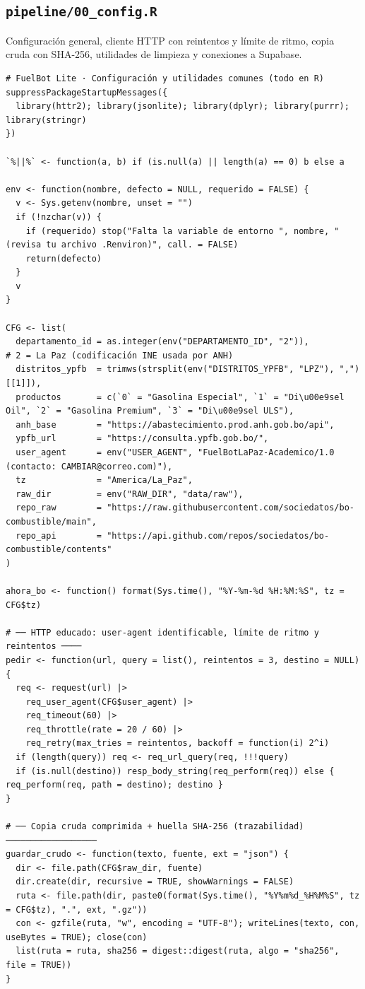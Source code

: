 \subsection{\texttt{pipeline/00\_config.R}}
Configuración general, cliente HTTP con reintentos y límite de ritmo, copia cruda con SHA-256, utilidades de limpieza y conexiones a Supabase.
\begin{lstlisting}[style=anexoR]
# FuelBot Lite · Configuración y utilidades comunes (todo en R)
suppressPackageStartupMessages({
  library(httr2); library(jsonlite); library(dplyr); library(purrr); library(stringr)
})

`%||%` <- function(a, b) if (is.null(a) || length(a) == 0) b else a

env <- function(nombre, defecto = NULL, requerido = FALSE) {
  v <- Sys.getenv(nombre, unset = "")
  if (!nzchar(v)) {
    if (requerido) stop("Falta la variable de entorno ", nombre, " (revisa tu archivo .Renviron)", call. = FALSE)
    return(defecto)
  }
  v
}

CFG <- list(
  departamento_id = as.integer(env("DEPARTAMENTO_ID", "2")),            # 2 = La Paz (codificación INE usada por ANH)
  distritos_ypfb  = trimws(strsplit(env("DISTRITOS_YPFB", "LPZ"), ",")[[1]]),
  productos       = c(`0` = "Gasolina Especial", `1` = "Di\u00e9sel Oil", `2` = "Gasolina Premium", `3` = "Di\u00e9sel ULS"),
  anh_base        = "https://abastecimiento.prod.anh.gob.bo/api",
  ypfb_url        = "https://consulta.ypfb.gob.bo/",
  user_agent      = env("USER_AGENT", "FuelBotLaPaz-Academico/1.0 (contacto: CAMBIAR@correo.com)"),
  tz              = "America/La_Paz",
  raw_dir         = env("RAW_DIR", "data/raw"),
  repo_raw        = "https://raw.githubusercontent.com/sociedatos/bo-combustible/main",
  repo_api        = "https://api.github.com/repos/sociedatos/bo-combustible/contents"
)

ahora_bo <- function() format(Sys.time(), "%Y-%m-%d %H:%M:%S", tz = CFG$tz)

# ── HTTP educado: user-agent identificable, límite de ritmo y reintentos ────
pedir <- function(url, query = list(), reintentos = 3, destino = NULL) {
  req <- request(url) |>
    req_user_agent(CFG$user_agent) |>
    req_timeout(60) |>
    req_throttle(rate = 20 / 60) |>
    req_retry(max_tries = reintentos, backoff = function(i) 2^i)
  if (length(query)) req <- req_url_query(req, !!!query)
  if (is.null(destino)) resp_body_string(req_perform(req)) else { req_perform(req, path = destino); destino }
}

# ── Copia cruda comprimida + huella SHA-256 (trazabilidad) ──────────────────
guardar_crudo <- function(texto, fuente, ext = "json") {
  dir <- file.path(CFG$raw_dir, fuente)
  dir.create(dir, recursive = TRUE, showWarnings = FALSE)
  ruta <- file.path(dir, paste0(format(Sys.time(), "%Y%m%d_%H%M%S", tz = CFG$tz), ".", ext, ".gz"))
  con <- gzfile(ruta, "w", encoding = "UTF-8"); writeLines(texto, con, useBytes = TRUE); close(con)
  list(ruta = ruta, sha256 = digest::digest(ruta, algo = "sha256", file = TRUE))
}


\end{lstlisting}

